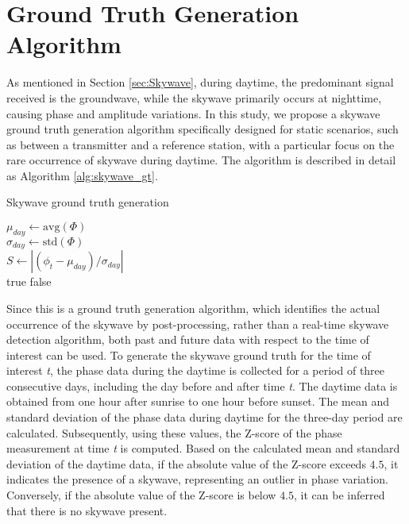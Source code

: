 \documentclass[conference]{IEEEtran}
\begin{document}
\section{Ground Truth Generation Algorithm}
\label{sec:GroundTruthGenerationAlgorithm}

As mentioned in Section \ref{sec:Skywave}, during daytime, the predominant signal received is the groundwave, while the skywave primarily occurs at nighttime, causing phase and amplitude variations.
In this study, we propose a skywave ground truth generation algorithm specifically designed for static scenarios, such as between a transmitter and a reference station, with a particular focus on the rare occurrence of skywave during daytime.
The algorithm is described in detail as Algorithm \ref{alg:skywave_gt}. 

\begin{algorithm}
\caption{Skywave ground truth generation}
\label{alg:skywave_gt}
\vspace{0.2em}
\vspace{0.1em}
$\mu _{day} \gets \mathrm{avg}\left( \Phi \right)$ \\
$\sigma _{day} \gets \mathrm{std}\left( \Phi \right)$ \\
$ S \gets \left|\left (\phi _{t}-\mu _{day}\right )/\sigma _{day} \right|$\\
\vspace{0.2em}
 {
        \vspace{0.2em}
        \Return true
        \vspace{0.2em}
}
\Return false
\vspace{0.2em}
\end{algorithm}
Since this is a ground truth generation algorithm, which identifies the actual occurrence of the skywave by post-processing, rather than a real-time skywave detection algorithm, both past and future data with respect to the time of interest can be used. 
To generate the skywave ground truth for the time of interest \textit{t}, the phase data during the daytime is collected for a period of three consecutive days, including the day before and after time \textit{t}. 
The daytime data is obtained from one hour after sunrise to one hour before sunset. 
The mean and standard deviation of the phase data during daytime for the three-day period are calculated. 
Subsequently, using these values, the Z-score of the phase measurement at time \textit{t} is computed. 
Based on the calculated mean and standard deviation of the daytime data, if the absolute value of the Z-score exceeds $4.5$, it indicates the presence of a skywave, representing an outlier in phase variation. 
Conversely, if the absolute value of the Z-score is below $4.5$, it can be inferred that there is no skywave present.
\end{document}
